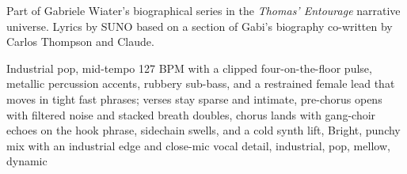
\begin{notes}
Part of Gabriele Wiater's biographical series in the \emph{Thomas’ Entourage} narrative universe. Lyrics by SUNO based on a section of Gabi's biography co-written by Carlos Thompson and Claude.
\end{notes}
\begin{style}
Industrial pop, mid-tempo 127 BPM with a clipped four-on-the-floor pulse, metallic percussion accents, rubbery sub-bass, and a restrained female lead that moves in tight fast phrases; verses stay sparse and intimate, pre-chorus opens with filtered noise and stacked breath doubles, chorus lands with gang-choir echoes on the hook phrase, sidechain swells, and a cold synth lift, Bright, punchy mix with an industrial edge and close-mic vocal detail, industrial, pop, mellow, dynamic
\end{style}

